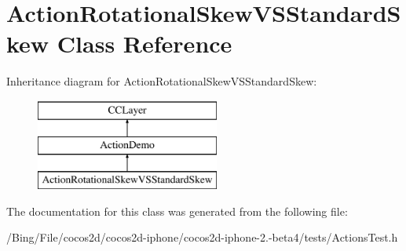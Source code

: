 \hypertarget{interface_action_rotational_skew_v_s_standard_skew}{\section{Action\-Rotational\-Skew\-V\-S\-Standard\-Skew Class Reference}
\label{interface_action_rotational_skew_v_s_standard_skew}
}
Inheritance diagram for Action\-Rotational\-Skew\-V\-S\-Standard\-Skew\-:\begin{figure}[H]
\begin{center}
\leavevmode
\includegraphics[height=3.000000cm]{interface_action_rotational_skew_v_s_standard_skew}
\end{center}
\end{figure}


The documentation for this class was generated from the following file\-:\begin{DoxyCompactItemize}
\item 
/\-Bing/\-File/cocos2d/cocos2d-\/iphone/cocos2d-\/iphone-\/2.-\/beta4/tests/Actions\-Test.\-h\end{DoxyCompactItemize}

